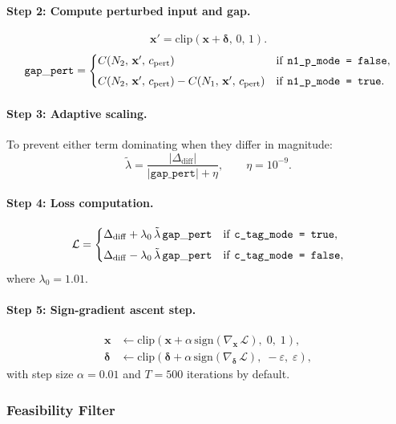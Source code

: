 \documentclass[11pt,a4paper]{article}
\theoremstyle{definition}
\theoremstyle{plain}
\newcommand{\Conf}[3]{C(#1,\,#2,\,#3)}
\newcommand{\NN}[1]{N_{#1}}
\newcommand{\vx}{\mathbf{x}}
\newcommand{\ve}{\boldsymbol{\delta}}
\newcommand{\vxp}{\mathbf{x}'}
\newcommand{\eps}{\varepsilon}
\begin{document}
\paragraph{Step 2: Compute perturbed input and gap.}
\[
  \vxp = \mathrm{clip}(\vx + \ve,\, 0,\, 1).
\]
\[
  \mathtt{gap\_pert} = \begin{cases}
    \Conf{\NN{2}}{\vxp}{c_{\mathrm{pert}}} & \text{if \texttt{n1\_p\_mode = false}}, \\[4pt]
    \Conf{\NN{2}}{\vxp}{c_{\mathrm{pert}}} - \Conf{\NN{1}}{\vxp}{c_{\mathrm{pert}}} & \text{if \texttt{n1\_p\_mode = true}}.
  \end{cases}
\]

\paragraph{Step 3: Adaptive scaling.}
To prevent either term dominating when they differ in magnitude:
\[
  \tilde{\lambda} = \frac{|\Delta_{\mathrm{diff}}|}{|\mathtt{gap\_pert}| + \eta}, \qquad \eta = 10^{-9}.
\]

\paragraph{Step 4: Loss computation.}
\[
  \mathcal{L} = \begin{cases}
    \Delta_{\mathrm{diff}} + \lambda_0\,\tilde{\lambda}\,\mathtt{gap\_pert} & \text{if \texttt{c\_tag\_mode = true}}, \\[4pt]
    \Delta_{\mathrm{diff}} - \lambda_0\,\tilde{\lambda}\,\mathtt{gap\_pert} & \text{if \texttt{c\_tag\_mode = false}},
  \end{cases}
\]
where $\lambda_0 = 1.01$.

\paragraph{Step 5: Sign-gradient ascent step.}
\begin{align*}
  \vx &\leftarrow \mathrm{clip}\!\left(\vx + \alpha\,\mathrm{sign}(\nabla_{\vx}\,\mathcal{L}),\; 0,\; 1\right), \\
  \ve &\leftarrow \mathrm{clip}\!\left(\ve + \alpha\,\mathrm{sign}(\nabla_{\ve}\,\mathcal{L}),\; -\eps,\; \eps\right),
\end{align*}
with step size $\alpha = 0.01$ and $T = 500$ iterations by default.

\subsubsection{Feasibility Filter}
\end{document}
